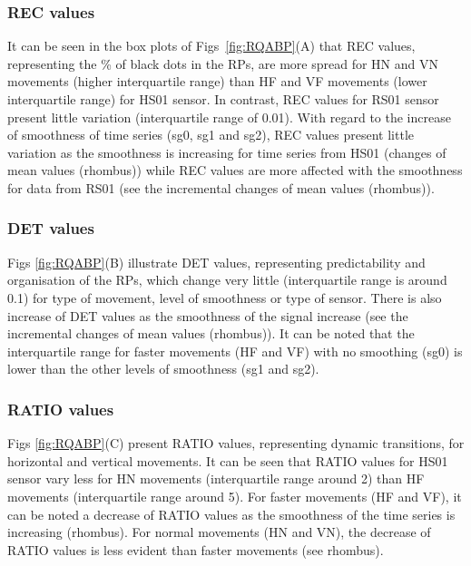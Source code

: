 \documentclass[fleqn,10pt]{wlscirep}
\begin{document}
\subsubsection*{REC values}
It can be seen in the box plots of Figs~\ref{fig:RQABP}(A) that REC values, 
representing the \% of black dots in the RPs, 
are more spread for HN and VN movements (higher interquartile range) 
than HF and VF movements (lower interquartile range) for HS01 sensor. 
In contrast, REC values for RS01 sensor present little variation 
(interquartile range of 0.01).
With regard to the increase of smoothness of time series 
(sg0, sg1 and sg2), REC values present little 
variation as the smoothness is increasing for time series from HS01 
(changes of mean values (rhombus)) while REC values are more affected with 
the smoothness for data from RS01 
(see the incremental changes of mean values (rhombus)).


\subsubsection*{DET values}
Figs \ref{fig:RQABP}(B) illustrate DET values, 
representing predictability and organisation of the RPs, 
which change very little (interquartile range is around 0.1) 
for type of movement, level of smoothness or type of sensor.
There is also increase of DET values as the smoothness of the signal increase 
(see the incremental changes of mean values (rhombus)).
It can be noted that the interquartile range for faster movements
(HF and VF) with no smoothing (sg0) is lower than the other
levels of smoothness (sg1 and sg2).

\subsubsection*{RATIO values}
Figs \ref{fig:RQABP}(C) present RATIO values, representing dynamic transitions, 
for horizontal and vertical movements.
It can be seen that RATIO values for HS01 sensor vary less 
for HN movements (interquartile range around 2)
than HF movements (interquartile range around 5).
For faster movements (HF and VF), it can be noted a decrease of 
RATIO values as the smoothness of the time series is increasing (rhombus).
For normal movements (HN and VN), the decrease of RATIO values
is less evident than faster movements (see rhombus).
\end{document}
